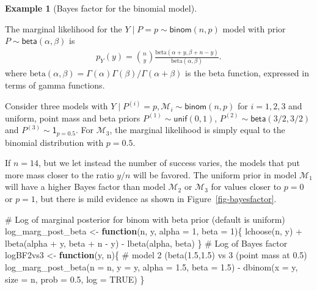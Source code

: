 \documentclass[
  11pt,
  letterpaper,
]{scrbook}
\newenvironment{Shaded}{\begin{snugshade}}{\end{snugshade}}
\newcommand{\AttributeTok}[1]{\textcolor[rgb]{0.40,0.45,0.13}{#1}}
\newcommand{\CommentTok}[1]{\textcolor[rgb]{0.37,0.37,0.37}{#1}}
\newcommand{\ConstantTok}[1]{\textcolor[rgb]{0.56,0.35,0.01}{#1}}
\newcommand{\ControlFlowTok}[1]{\textcolor[rgb]{0.00,0.23,0.31}{\textbf{#1}}}
\newcommand{\DecValTok}[1]{\textcolor[rgb]{0.68,0.00,0.00}{#1}}
\newcommand{\FloatTok}[1]{\textcolor[rgb]{0.68,0.00,0.00}{#1}}
\newcommand{\FunctionTok}[1]{\textcolor[rgb]{0.28,0.35,0.67}{#1}}
\newcommand{\NormalTok}[1]{\textcolor[rgb]{0.00,0.23,0.31}{#1}}
\newcommand{\OtherTok}[1]{\textcolor[rgb]{0.00,0.23,0.31}{#1}}
\newcommand{\SpecialCharTok}[1]{\textcolor[rgb]{0.37,0.37,0.37}{#1}}
\theoremstyle{definition}
\theoremstyle{plain}
\theoremstyle{plain}
\theoremstyle{definition}
\theoremstyle{definition}
\newtheorem{example}{Example}[chapter]
\theoremstyle{remark}
\begin{document}
\begin{example}[Bayes factor for the binomial
model]\protect\hypertarget{exm-bayesfactor}{}\label{exm-bayesfactor}

The marginal likelihood for the \(Y \mid P=p \sim \mathsf{binom}(n,p)\)
model with prior \(P \sim \mathsf{beta}(\alpha, \beta)\) is
\begin{align*}
p_{Y}(y) = \binom{n}{y} \frac{\mathrm{beta}(\alpha + y, \beta + n - y)}{\mathrm{beta}(\alpha, \beta)}.
\end{align*} where
\(\mathrm{beta}(\alpha, \beta) = \Gamma(\alpha)\Gamma(\beta)/\Gamma(\alpha+\beta)\)
is the beta function, expressed in terms of gamma functions.

Consider three models with
\(Y \mid P^{(i)}=p, \mathcal{M}_i \sim \mathsf{binom}(n, p)\) for
\(i=1, 2, 3\) and uniform, point mass and beta priors
\(P^{(1)}\sim \mathsf{unif}(0,1)\),
\(P^{(2)} \sim \mathsf{beta}(3/2, 3/2)\) and
\(P^{(3)}\sim \mathsf{1}_{p=0.5}\). For \(\mathcal{M}_3\), the marginal
likelihood is simply equal to the binomial distribution with \(p=0.5\).

If \(n=14\), but we let instead the number of success varies, the models
that put more mass closer to the ratio \(y/n\) will be favored. The
uniform prior in model \(\mathcal{M}_1\) will have a higher Bayes factor
than model \(\mathcal{M}_2\) or \(\mathcal{M}_3\) for values closer to
\(p=0\) or \(p=1\), but there is mild evidence as shown in
Figure~\ref{fig-bayesfactor}.

\begin{Shaded}
\begin{Highlighting}[]
\CommentTok{\# Log of marginal posterior for binom with beta prior (default is uniform)}
\NormalTok{log\_marg\_post\_beta }\OtherTok{\textless{}{-}} \ControlFlowTok{function}\NormalTok{(n, y, }\AttributeTok{alpha =} \DecValTok{1}\NormalTok{, }\AttributeTok{beta =} \DecValTok{1}\NormalTok{)\{}
  \FunctionTok{lchoose}\NormalTok{(n, y) }\SpecialCharTok{+} \FunctionTok{lbeta}\NormalTok{(alpha }\SpecialCharTok{+}\NormalTok{ y, beta }\SpecialCharTok{+}\NormalTok{ n }\SpecialCharTok{{-}}\NormalTok{ y) }\SpecialCharTok{{-}} \FunctionTok{lbeta}\NormalTok{(alpha, beta)}
\NormalTok{\}}
\CommentTok{\# Log of Bayes factor}
\NormalTok{logBF2vs3 }\OtherTok{\textless{}{-}} \ControlFlowTok{function}\NormalTok{(y, n)\{ }\CommentTok{\# model 2 (beta(1.5,1.5) vs 3 (point mass at 0.5)}
  \FunctionTok{log\_marg\_post\_beta}\NormalTok{(}\AttributeTok{n =}\NormalTok{ n, }\AttributeTok{y =}\NormalTok{ y, }\AttributeTok{alpha =} \FloatTok{1.5}\NormalTok{, }\AttributeTok{beta =} \FloatTok{1.5}\NormalTok{) }\SpecialCharTok{{-}} \FunctionTok{dbinom}\NormalTok{(}\AttributeTok{x =}\NormalTok{ y, }\AttributeTok{size =}\NormalTok{ n, }\AttributeTok{prob =} \FloatTok{0.5}\NormalTok{, }\AttributeTok{log =} \ConstantTok{TRUE}\NormalTok{)}
\NormalTok{\}}
\end{Highlighting}
\end{Shaded}


\end{example}
\end{document}
